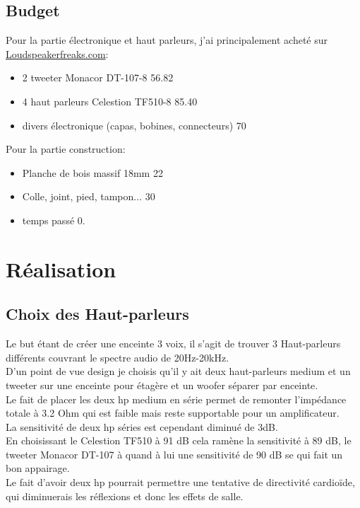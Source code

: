 \documentclass[a4paper,english]{report}
\begin{document}
			\section{Budget}
			Pour la partie électronique et haut parleurs, j'ai principalement acheté sur \href{http://loudspeakerfreaks.com/intro.asp}{Loudspeakerfreaks.com}:
			\begin{itemize}
				\item 2 tweeter Monacor DT-107-8 56.82 \texteuro
				\item 4 haut parleurs Celestion TF510-8 85.40\texteuro
				\item divers électronique (capas, bobines, connecteurs) 70\texteuro

			\end{itemize}
			Pour la partie construction:
			\begin{itemize}
				\item Planche de bois massif 18mm 22\texteuro 
				\item Colle, joint, pied, tampon... 30\texteuro
				\item temps passé 0\texteuro.				
			\end{itemize}
			
			\chapter{Réalisation}
			
			\section{Choix des Haut-parleurs}
			Le but étant de créer une enceinte 3 voix, il s'agit de trouver 3 Haut-parleurs différents couvrant le spectre audio de 20Hz-20kHz.\\
			D'un point de vue design je choisis qu'il y ait deux haut-parleurs medium et un tweeter sur une enceinte pour étagère et un woofer séparer par enceinte.\\
			Le fait de placer les deux hp medium en série permet de remonter l'impédance totale à 3.2 Ohm qui est faible mais reste supportable pour un amplificateur.\\
			La sensitivité de deux hp séries est cependant diminué de 3dB. \\
			En choisissant le Celestion TF510 à 91 dB cela ramène la sensitivité à 89 dB, le tweeter Monacor DT-107 à quand à lui une sensitivité de 90 dB se qui fait un bon appairage.\\
			Le fait d'avoir deux hp pourrait permettre une tentative de directivité cardioïde, qui diminuerais les réflexions et donc les effets de salle.
			
\end{document}
